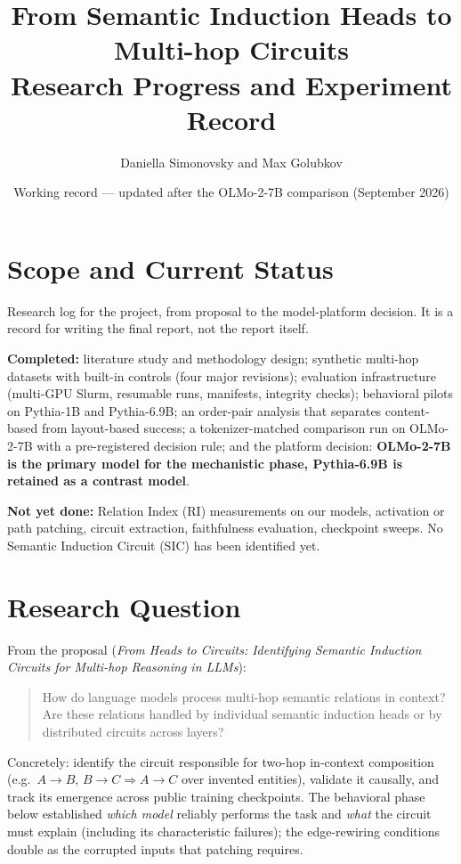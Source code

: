 \documentclass[11pt,a4paper]{article}
\title{From Semantic Induction Heads to Multi-hop Circuits\\
\large Research Progress and Experiment Record}
\author{Daniella Simonovsky and Max Golubkov}
\date{Working record --- updated after the OLMo-2-7B comparison (September 2026)}
\begin{document}
\maketitle

\section{Scope and Current Status}
Research log for the project, from proposal to the model-platform decision. It is a record for writing the final report, not the report itself.

\textbf{Completed:} literature study and methodology design; synthetic multi-hop datasets with built-in controls (four major revisions); evaluation infrastructure (multi-GPU Slurm, resumable runs, manifests, integrity checks); behavioral pilots on Pythia-1B and Pythia-6.9B; an order-pair analysis that separates content-based from layout-based success; a tokenizer-matched comparison run on OLMo-2-7B with a pre-registered decision rule; and the platform decision: \textbf{OLMo-2-7B is the primary model for the mechanistic phase, Pythia-6.9B is retained as a contrast model}.

\textbf{Not yet done:} Relation Index (RI) measurements on our models, activation or path patching, circuit extraction, faithfulness evaluation, checkpoint sweeps. No Semantic Induction Circuit (SIC) has been identified yet.

\section{Research Question}
From the proposal (\emph{From Heads to Circuits: Identifying Semantic Induction Circuits for Multi-hop Reasoning in LLMs}):
\begin{quote}
How do language models process multi-hop semantic relations in context? Are these relations handled by individual semantic induction heads or by distributed circuits across layers?
\end{quote}
Concretely: identify the circuit responsible for two-hop in-context composition (e.g.\ $A\!\to\!B$, $B\!\to\!C \Rightarrow A\!\to\!C$ over invented entities), validate it causally, and track its emergence across public training checkpoints. The behavioral phase below established \emph{which model} reliably performs the task and \emph{what} the circuit must explain (including its characteristic failures); the edge-rewiring conditions double as the corrupted inputs that patching requires.
\end{document}
